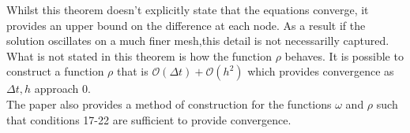 \documentclass[12pt]{article}
\renewcommand{\O}{\mathcal{O}}
\theoremstyle{definition}
\begin{document}
Whilst this theorem doesn't explicitly state that the equations converge, it provides an upper bound on the difference at each node. As a result if the solution oscillates on a much finer mesh,this detail is not necessarilly captured. What is not stated in this theorem is how the function $\rho$ behaves. It is possible to construct a function $\rho$ that is $\O(\Delta t)+\O(h^2)$ which provides convergence as $\Delta t, h$ approach $0$.\\
The paper also provides a method of construction for the functions $\omega$ and $\rho$ such that conditions 17-22 are sufficient to provide convergence.
\end{document}
